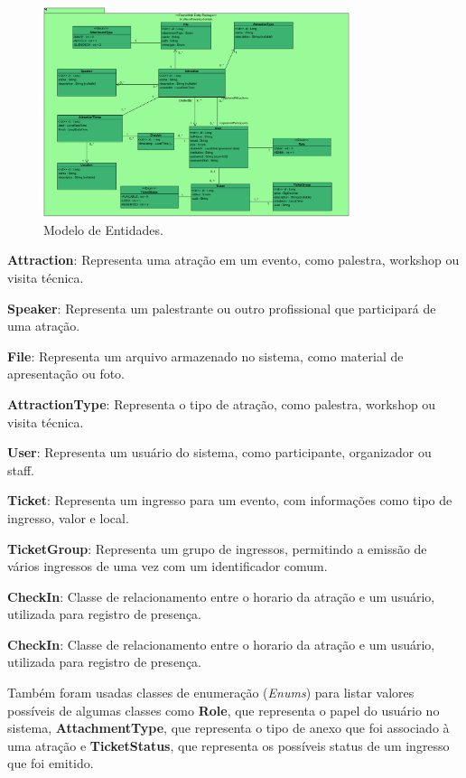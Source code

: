 \begin{figure}[h]
	\centering
	\includegraphics[width=0.8\textwidth]{figuras/ClassesDeDominio.PNG}
	\caption{Modelo de Entidades.}
	\label{figura-dominio}
\end{figure}

\textbf{Attraction}: Representa uma atração em um evento, como palestra, workshop ou visita técnica.

\textbf{Speaker}: Representa um palestrante ou outro profissional que participará de uma atração.

\textbf{File}: Representa um arquivo armazenado no sistema, como material de apresentação ou foto.

\textbf{AttractionType}: Representa o tipo de atração, como palestra, workshop ou visita técnica.

\textbf{User}: Representa um usuário do sistema, como participante, organizador ou staff.

\textbf{Ticket}: Representa um ingresso para um evento, com informações como tipo de ingresso, valor e local.

\textbf{TicketGroup}: Representa um grupo de ingressos, permitindo a emissão de vários ingressos de uma vez com um identificador comum.

\textbf{CheckIn}: Classe de relacionamento entre o horario da atração e um usuário, utilizada para registro de presença.

\textbf{CheckIn}: Classe de relacionamento entre o horario da atração e um usuário, utilizada para registro de presença.

Também foram usadas classes de enumeração (\textit{Enums}) para listar valores possíveis de algumas classes como \textbf{Role}, que representa o papel do usuário no sistema, \textbf{AttachmentType}, que representa o tipo de anexo que foi associado à uma atração e \textbf{TicketStatus}, que representa os possíveis status de um ingresso que foi emitido.

